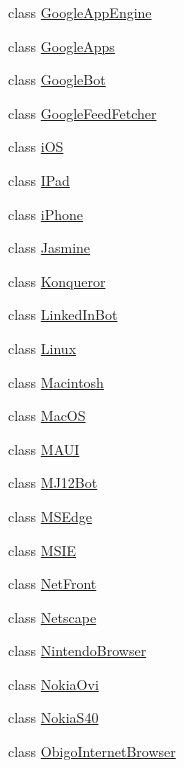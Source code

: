 \begin{DoxyCompactItemize}
class \hyperlink{classhttpagentparser_1_1_google_app_engine}{Google\+App\+Engine}
\item 
class \hyperlink{classhttpagentparser_1_1_google_apps}{Google\+Apps}
\item 
class \hyperlink{classhttpagentparser_1_1_google_bot}{Google\+Bot}
\item 
class \hyperlink{classhttpagentparser_1_1_google_feed_fetcher}{Google\+Feed\+Fetcher}
\item 
class \hyperlink{classhttpagentparser_1_1i_o_s}{i\+OS}
\item 
class \hyperlink{classhttpagentparser_1_1_i_pad}{I\+Pad}
\item 
class \hyperlink{classhttpagentparser_1_1i_phone}{i\+Phone}
\item 
class \hyperlink{classhttpagentparser_1_1_jasmine}{Jasmine}
\item 
class \hyperlink{classhttpagentparser_1_1_konqueror}{Konqueror}
\item 
class \hyperlink{classhttpagentparser_1_1_linked_in_bot}{Linked\+In\+Bot}
\item 
class \hyperlink{classhttpagentparser_1_1_linux}{Linux}
\item 
class \hyperlink{classhttpagentparser_1_1_macintosh}{Macintosh}
\item 
class \hyperlink{classhttpagentparser_1_1_mac_o_s}{Mac\+OS}
\item 
class \hyperlink{classhttpagentparser_1_1_m_a_u_i}{M\+A\+UI}
\item 
class \hyperlink{classhttpagentparser_1_1_m_j12_bot}{M\+J12\+Bot}
\item 
class \hyperlink{classhttpagentparser_1_1_m_s_edge}{M\+S\+Edge}
\item 
class \hyperlink{classhttpagentparser_1_1_m_s_i_e}{M\+S\+IE}
\item 
class \hyperlink{classhttpagentparser_1_1_net_front}{Net\+Front}
\item 
class \hyperlink{classhttpagentparser_1_1_netscape}{Netscape}
\item 
class \hyperlink{classhttpagentparser_1_1_nintendo_browser}{Nintendo\+Browser}
\item 
class \hyperlink{classhttpagentparser_1_1_nokia_ovi}{Nokia\+Ovi}
\item 
class \hyperlink{classhttpagentparser_1_1_nokia_s40}{Nokia\+S40}
\item 
class \hyperlink{classhttpagentparser_1_1_obigo_internet_browser}{Obigo\+Internet\+Browser}
\item 

\end{DoxyCompactItemize}

